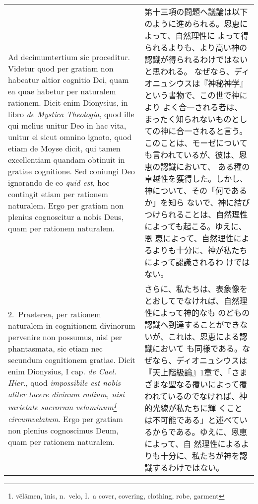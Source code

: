 \documentclass[10pt]{jsarticle} %
\begin{document}
\begin{longtable}{p{21em}p{21em}}


{\sc  Ad decimumtertium sic proceditur}. Videtur quod per gratiam
 non habeatur altior cognitio Dei, quam ea quae habetur per naturalem
 rationem. Dicit enim Dionysius, in libro {\it de Mystica Theologia}, quod
 ille qui melius unitur Deo in hac vita, unitur ei sicut omnino ignoto,
 quod etiam de Moyse dicit, qui tamen excellentiam quandam obtinuit in
 gratiae cognitione. Sed coniungi Deo ignorando de eo {\it quid est}, hoc
 contingit etiam per rationem naturalem. Ergo per gratiam non plenius
 cognoscitur a nobis Deus, quam per rationem naturalem.


&

第十三項の問題へ議論は以下のように進められる。恩恵によって、自然理性に
よって得られるよりも、より高い神の認識が得られるわけではないと思われる。
なぜなら、ディオニュシウスは『神秘神学』という書物で、この世で神により
よく合一される者は、まったく知られないものとしての神に合一されると言う。
このことは、モーゼについても言われているが、彼は、恩恵の認識において、
ある種の卓越性を獲得した。しかし、神について、その「何であるか」を知ら
ないで、神に結びつけられることは、自然理性によっても起こる。ゆえに、恩
恵によって、自然理性によるよりも十分に、神が私たちによって認識されるわ
けではない。

\\




2.~{\sc  Praeterea}, per rationem naturalem in cognitionem
 divinorum pervenire non possumus, nisi per phantasmata, sic etiam nec
 secundum cognitionem gratiae. Dicit enim Dionysius, I cap. {\it de
 Cael. Hier}., quod {\it impossibile est nobis aliter lucere divinum radium,
 nisi varietate sacrorum velaminum\footnote{v\={e}l\={a}men, \u{\i}nis, n.\ velo,
I.~a cover, covering, clothing, robe, garment} circumvelatum}. Ergo per gratiam non
 plenius cognoscimus Deum, quam per rationem naturalem.


&

さらに、私たちは、表象像をとおしてでなければ、自然理性によって神的なも
のどもの認識へ到達することができないが、これは、恩恵による認識において
も同様である。なぜなら、ディオニュシウスは『天上階級論』1章で、「さま
ざまな聖なる覆いによって覆われているのでなければ、神的光線が私たちに輝
くことは不可能である」と述べているからである。ゆえに、恩恵によって、自
然理性によるよりも十分に、私たちが神を認識するわけではない。

\\





\end{longtable}
\end{document}
